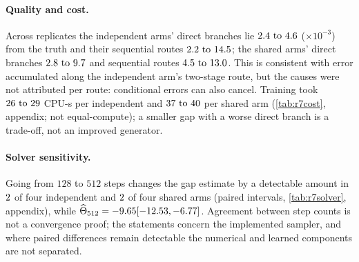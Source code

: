 \documentclass{article}
\theoremstyle{plain}
\theoremstyle{definition}
\theoremstyle{remark}
\begin{document}
\paragraph{Quality and cost.}
Across replicates the independent arms' direct branches lie $2.4\text{ to }4.6$ ($\times10^{-3}$) from the truth and their sequential routes $2.2\text{ to }14.5$; the shared arms' direct branches $2.8\text{ to }9.7$ and sequential routes $4.5\text{ to }13.0$.
This is consistent with error accumulated along the independent arm's two-stage route, but the causes were not attributed per route: conditional errors can also cancel.
Training took $26\text{ to }29$ CPU-s per independent and $37\text{ to }40$ per shared arm (\cref{tab:r7cost}, appendix; not equal-compute); a smaller gap with a worse direct branch is a trade-off, not an improved generator.

\paragraph{Solver sensitivity.}
Going from $128$ to $512$ steps changes the gap estimate by a detectable amount in $2$ of four independent and $2$ of four shared arms (paired intervals, \cref{tab:r7solver}, appendix), while $\widehat\Theta_{512}=-9.65 [-12.53, -6.77]$.
Agreement between step counts is not a convergence proof; the statements concern the implemented sampler, and where paired differences remain detectable the numerical and learned components are not separated.

\end{document}

